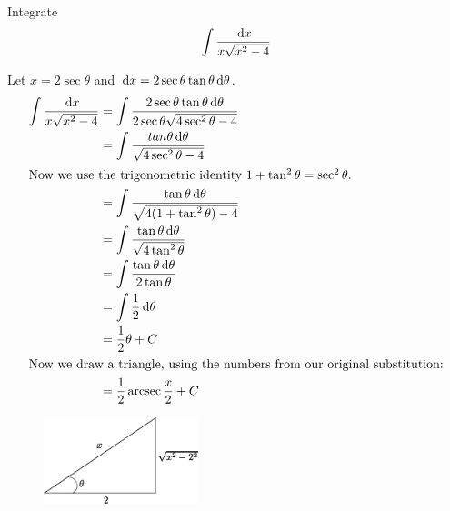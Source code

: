 \begin{ex}
  Integrate
  \[ \int \frac{\,\mathrm{d} x}{x \sqrt {x^2 -4}} \]
  \begin{sol}
    Let $x=2 \sec \theta$ and $\,\mathrm{d} x = 2 \sec \theta \tan \theta \,\mathrm{d} \theta$.
    \begin{align*}
      \int \frac{\,\mathrm{d} x}{x \sqrt {x^2 -4}}
      &= \int \frac{2 \sec \theta \tan \theta \,\mathrm{d} \theta}{2 \sec \theta \sqrt{4\sec^2 \theta -4}} \\
      &= \int\frac{tan \theta \,\mathrm{d} \theta}{\sqrt{4 \sec^2 \theta -4}} \\
      \intertext{Now we use the trigonometric identity $1+\tan^2\theta=\sec^2\theta$.}
      &= \int \frac{\tan\theta\,\mathrm{d}\theta}{\sqrt{4(1+\tan^2\theta)-4}}\\
      &= \int \frac{\tan\theta\,\mathrm{d}\theta}{\sqrt{4\tan^2\theta}}\\
      &= \int\frac{\tan\theta\,\mathrm{d}\theta}{2\tan\theta}\\
      &= \int \frac{1}{2}\,\mathrm{d}\theta \\
      &= \frac{1}{2}\theta+C\\
      \intertext{Now we draw a triangle, using the numbers from our original substitution:}
      &=\frac{1}{2}\operatorname{arcsec}{\frac{x}{2}} +C
    \end{align*}
    \begin{figure}[H]
      \begin{center}
        \includegraphics[width=0.4\textwidth]{continuous/integration/secexample.eps}
      \end{center}
    \end{figure}
  \end{sol}
\end{ex}
